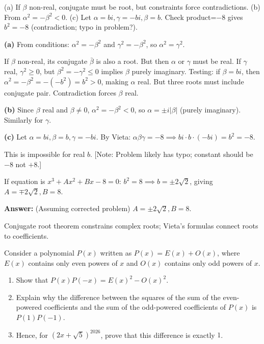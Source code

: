 \vspace{0.5cm}
\begin{hintbox}
(a) If $\beta$ non-real, conjugate must be root, but constraints force contradictions. (b) From $\alpha^2=-\beta^2<0$. (c) Let $\alpha=bi, \gamma=-bi, \beta=b$. Check product=$-8$ gives $b^2=-8$ (contradiction; typo in problem?).
\end{hintbox}

\begin{solution}
\textbf{(a)} From conditions: $\alpha^2 = -\beta^2$ and $\gamma^2 = -\beta^2$, so $\alpha^2 = \gamma^2$.

If $\beta$ non-real, its conjugate $\bar{\beta}$ is also a root. But then $\alpha$ or $\gamma$ must be real. If $\gamma$ real, $\gamma^2 \ge 0$, but $\beta^2=-\gamma^2 \le 0$ implies $\beta$ purely imaginary. Testing: if $\beta=bi$, then $\alpha^2=-\beta^2=-(-b^2)=b^2>0$, making $\alpha$ real. But three roots must include conjugate pair. Contradiction forces $\beta$ real.

\textbf{(b)} Since $\beta$ real and $\beta \neq 0$, $\alpha^2 = -\beta^2 < 0$, so $\alpha = \pm i|\beta|$ (purely imaginary). Similarly for $\gamma$.

\textbf{(c)} Let $\alpha=bi, \beta=b, \gamma=-bi$. By Vieta: $\alpha\beta\gamma = -8 \implies bi \cdot b \cdot (-bi) = b^2 = -8$.

This is impossible for real $b$. [Note: Problem likely has typo; constant should be $-8$ not $+8$.]

If equation is $x^3+Ax^2+Bx-8=0$: $b^2=8 \implies b=\pm 2\sqrt{2}$, giving $A=\mp 2\sqrt{2}, B=8$.

\textbf{Answer:} (Assuming corrected problem) $A=\pm 2\sqrt{2}, B=8$.
\end{solution}

\begin{takeaways}
Conjugate root theorem constrains complex roots; Vieta's formulas connect roots to coefficients.
\end{takeaways}

\vspace{1cm}

\begin{problem}
Consider a polynomial $P(x)$ written as $P(x) = E(x) + O(x)$, where $E(x)$ contains only even powers of $x$ and $O(x)$ contains only odd powers of $x$.
\begin{enumerate}
    \item[(i)] Show that $P(x)P(-x) = E(x)^2 - O(x)^2$.
    \item[(ii)] Explain why the difference between the squares of the sum of the even-powered coefficients and the sum of the odd-powered coefficients of $P(x)$ is $P(1)P(-1)$.
    \item[(iii)] Hence, for $(2x + \sqrt{5})^{2026}$, prove that this difference is exactly $1$.
\end{enumerate}
\end{problem}

